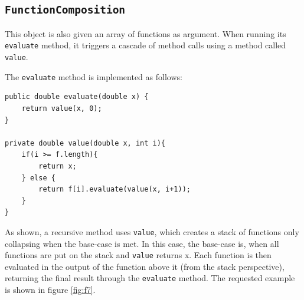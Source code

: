 \subsection{\texttt{FunctionComposition}}
This object is also given an array of functions as argument. 
When running its \texttt{evaluate} method, it triggers a cascade of method calls using a method called \texttt{value}.

The \texttt{evaluate} method is implemented as follows:

\begin{lstlisting}
public double evaluate(double x) {
	return value(x, 0);
}

private double value(double x, int i){
	if(i >= f.length){
		return x;
	} else {
		return f[i].evaluate(value(x, i+1));
	}
}
\end{lstlisting}

As shown, a recursive method uses \texttt{value}, which creates a stack of functions only collapsing when the base-case is met. In this case, the base-case is, when all functions are put on the stack and \texttt{value} returns x. Each function is then evaluated in the output of the function above it (from the stack perspective), returning the final result through the \texttt{evaluate} method. The requested example is shown in figure \ref{fig:f7}.


